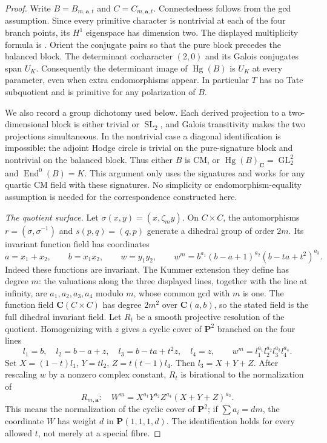\documentclass[10pt,reqno]{article}
\theoremstyle{emphasizedplain}
\theoremstyle{emphasizeddefinition}
\theoremstyle{emphasizeddefinition}
\DeclareMathOperator{\End}{End}
\DeclareMathOperator{\Hg}{Hg}
\DeclareMathOperator{\GL}{GL}
\DeclareMathOperator{\SL}{SL}
\newcommand{\C}{\mathbf C}
\begin{document}
\begin{proof}
Write $B=B_{m,\boldsymbol a,t}$ and $C=C_{m,\boldsymbol a,t}$.
Connectedness follows from the gcd assumption. Since every primitive
character is nontrivial at each of the four branch points, its
$H^1$ eigenspace has dimension two. The displayed multiplicity formula
is \cite[Lemma 2.7]{MoonenCyclic}. Orient the conjugate pairs so that
the pure block precedes the balanced block. The determinant cocharacter
$(2,0)$ and its Galois conjugates span $U_K$. Consequently the
determinant image of $\Hg(B)$ is $U_K$ at every parameter, even
when extra endomorphisms appear. In particular $T$ has no Tate
subquotient and is primitive for any polarization of $B$.

We also record a group dichotomy used below. Each derived projection
to a two-dimensional block is either trivial or $\SL_2$, and
Galois transitivity makes the two projections simultaneous. In the
nontrivial case a diagonal identification is impossible: the
adjoint Hodge circle is trivial on the pure-signature block and
nontrivial on the balanced block. Thus either $B$ is CM, or
$\Hg(B)_\C=\GL_2^2$ and $\End^0(B)=K$. This argument only
uses the signatures and works for any quartic CM field with these
signatures. No simplicity or endomorphism-equality assumption is
needed for the correspondence constructed here.

\emph{The quotient surface.} Let $\sigma(x,y)=(x,\zeta_m y)$.
On $C\times C$, the automorphisms
$r=(\sigma,\sigma^{-1})$ and $s(p,q)=(q,p)$ generate a dihedral
group of order $2m$. Its invariant function field has coordinates
\[
 a=x_1+x_2,\qquad b=x_1x_2,\qquad w=y_1y_2,
 \qquad w^m=b^{a_1}(b-a+1)^{a_2}(b-ta+t^2)^{a_3}.
\]
Indeed these functions are invariant. The Kummer extension they
define has degree $m$: the valuations along the three displayed
lines, together with the line at infinity, are $a_1,a_2,a_3,a_4$
modulo $m$, whose common gcd with $m$ is one. The function field
$\C(C\times C)$ has degree $2m^2$ over $\C(a,b)$, so the stated
field is the full dihedral invariant field.
Let $R_t$ be a smooth projective resolution of the quotient.
Homogenizing with $z$ gives a cyclic cover of $\mathbf P^2$
branched on the four lines
\[
 l_1=b,\quad l_2=b-a+z,\quad l_3=b-ta+t^2z,\quad l_4=z,
 \qquad w^m=l_1^{a_1}l_2^{a_2}l_3^{a_3}l_4^{a_4}.
\]
Set $X=(1-t)l_1$, $Y=t l_2$, $Z=t(t-1)l_4$.
Then $l_3=X+Y+Z$. After rescaling $w$ by a nonzero complex
constant, $R_t$ is birational to the normalization of
\[
 R_{m,\boldsymbol a}:\quad W^m=X^{a_1}Y^{a_2}Z^{a_4}(X+Y+Z)^{a_3}.
\]
This means the normalization of the cyclic cover of $\mathbf P^2$;
if $\sum a_i=dm$, the coordinate $W$ has weight $d$ in
$\mathbf P(1,1,1,d)$. The identification holds for every allowed $t$,
not merely at a special fibre.


\end{proof}
\end{document}
